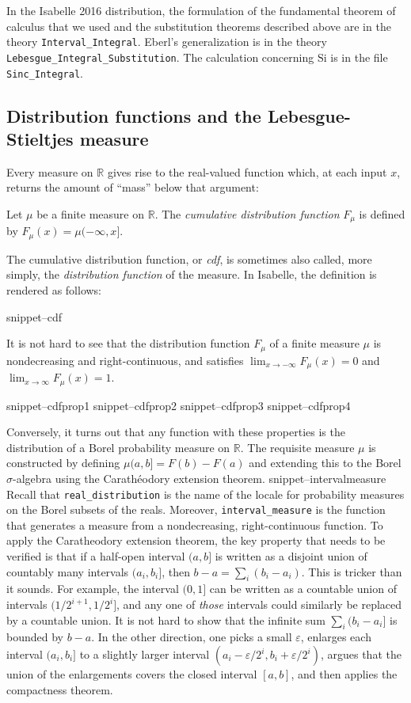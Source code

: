 \documentclass{svjour3}
\newcommand{\RR}{\mathbb{R}}
\newcommand{\fn}[1]{\mathrm{#1}} %
\newcommand{\Snippet}[1]{\csname snippet--#1\endcsname}
\begin{document}
In the Isabelle 2016 distribution, the formulation of the fundamental theorem of calculus that we used and the substitution theorems described above are in the theory \texttt{Interval\_Integral}. Eberl's generalization is in the theory \texttt{Lebesgue\_Integral\_Substitution}. The calculation concerning $\fn{Si}$ is in the file \texttt{Sinc\_Integral}.

\subsection{Distribution functions and the Lebesgue-Stieltjes measure}
\label{subsection:distribution:functions}

Every measure on $\RR$ gives rise to the real-valued function which, at each input $x$, returns the amount of ``mass'' below that argument:

\begin{definition}
Let $\mu$ be a finite measure on $\RR$. The \emph{cumulative distribution function} $F_\mu$ is defined by $F_\mu(x) = \mu (-\infty, x]$.
\end{definition}
The cumulative distribution function, or \emph{cdf}, is sometimes also called, more simply, the \emph{distribution function} of the measure. In Isabelle, the definition is rendered as follows:

\Snippet{cdf}

It is not hard to see that the distribution function $F_\mu$ of a finite measure $\mu$ is nondecreasing and right-continuous, and satisfies $\lim_{x \rightarrow -\infty} F_\mu(x) = 0$ and \linebreak $\lim_{x \rightarrow \infty} F_\mu(x) = 1$.

\Snippet{cdfprop1}
\Snippet{cdfprop2}
\Snippet{cdfprop3}
\Snippet{cdfprop4}

Conversely, it turns out that any function with these properties is the distribution of a Borel probability measure on $\RR$. The requisite measure $\mu$ is constructed by defining $\mu (a,b] = F(b) - F(a)$ and extending this to the Borel $\sigma$-algebra using the Carath\'eodory extension theorem.
\Snippet{intervalmeasure}
Recall that \texttt{real\_distribution} is the name of the locale for probability measures on the Borel subsets of the reals. Moreover, \texttt{interval\_measure} is the function that generates a measure from a nondecreasing, right-continuous function. To apply the Caratheodory extension theorem, the key property that needs to be verified is that if a half-open interval $(a, b]$ is written as a disjoint union of countably many intervals $(a_i, b_i]$, then $b - a = \sum_i (b_i - a_i)$. This is tricker than it sounds. For example, the interval $(0, 1]$ can be written as a countable union of intervals $(1/2^{i+1}, 1/2^i]$, and any one of \emph{those} intervals could similarly be replaced by a countable union. It is not hard to show that the infinite sum $\sum_i (b_i - a_i]$ is bounded by $b - a$. In the other direction, one picks a small $\varepsilon$, enlarges each interval $(a_i, b_i]$ to a slightly larger interval $(a_i - \varepsilon/2^i, b_i + \varepsilon / 2^i)$, argues that the union of the enlargements covers the closed interval $[a, b]$, and then applies the compactness theorem.
\end{document}

